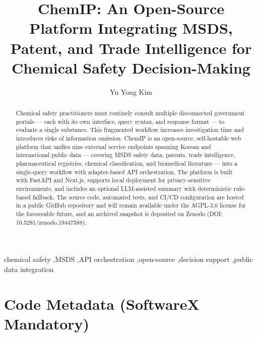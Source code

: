 \documentclass[preprint,12pt]{elsarticle}
\begin{document}
\begin{frontmatter}

\title{ChemIP: An Open-Source Platform Integrating MSDS, Patent, and Trade Intelligence for Chemical Safety Decision-Making}

\author[wisc]{Yu Yong Kim}


\begin{abstract}
Chemical safety practitioners must routinely consult multiple disconnected government portals --- each with its own interface, query syntax, and response format --- to evaluate a single substance. This fragmented workflow increases investigation time and introduces risks of information omission. ChemIP is an open-source, self-hostable web platform that unifies nine external service endpoints spanning Korean and international public data --- covering MSDS safety data, patents, trade intelligence, pharmaceutical registries, chemical classification, and biomedical literature --- into a single-query workflow with adapter-based API orchestration. The platform is built with FastAPI and Next.js, supports local deployment for privacy-sensitive environments, and includes an optional LLM-assisted summary with deterministic rule-based fallback. The source code, automated tests, and CI/CD configuration are hosted in a public GitHub repository and will remain available under the AGPL-3.0 license for the foreseeable future, and an archived snapshot is deposited on Zenodo (DOI: 10.5281/zenodo.19447588).
\end{abstract}

\begin{keyword}
chemical safety \sep MSDS \sep API orchestration \sep open-source \sep decision support \sep public data integration
\end{keyword}

\end{frontmatter}


\section*{Code Metadata (SoftwareX Mandatory)}
\end{document}
